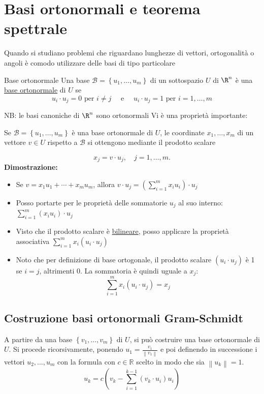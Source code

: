 \section{Basi ortonormali e teorema spettrale}
Quando si studiano problemi che riguardano lunghezze di vettori, ortogonalità o angoli è comodo utilizzare delle basi di tipo particolare

\begin{definizione}{Base ortonormale}
	Una base $ \mathcal{B}= \left\{ u_1,\ldots,u_m \right\}  $ di un sottospazio $ U $ di $ \R^{n} $ è una \underline{base ortonormale} di $ U $ se
	\[
		u_i \cdot u_j = 0 \text{ per } i \neq j \quad \text{ e } \quad  u_i \cdot u_j = 1 \text{ per } i=1,\ldots,m
	\]
\end{definizione}

NB: le basi canoniche di $ \R^{n} $ sono ortonormali
\vskip3mm
Vi è una proprietà importante:
\begin{tcolorbox}
	Se $\mathcal{B}=\left\{u_1, \ldots , u_m\right\}$ è una base ortonormale di $U$, le coordinate $x_1, \ldots, x_m$ di un vettore $v \in U$ rispetto a $\mathcal{B}$ si ottengono mediante il prodotto scalare

\end{tcolorbox}

\[
	x_j=v \cdot u_j, \quad j=1, \ldots, m .
\]
\textbf{Dimostrazione:}
\begin{itemize}
	\item Se $v=x_1 u_1+\cdots+x_m u_m$, allora $v \cdot u_j=\left( \sum_{i=1}^m x_iu_i \right)\cdot u_j$
	\item Posso portarte per le proprietà delle sommatorie $ u_j $ al suo interno: $ \sum_{i=1}^{m} \left( x_i u_i \right) \cdot u_j $
	\item Visto che il prodotto scalare è \underline{bilineare}, posso applicare la proprietà associativa $  \sum_{i=1}^{m}  x_i \left( u_i \cdot u_j \right) $
	\item Noto che per definizione di base ortogonale, il prodotto scalare $ \left( u_i \cdot u_j \right)  $ è 1 se $ i=j $, altrimenti 0. La sommatoria è quindi uguale a $ x_j $:
	      \[
		      \sum_{i=1}^{m} x_i \left( u_i \cdot u_j \right) = x_j
	      \]
\end{itemize}
\subsection{Costruzione basi ortonormali Gram-Schmidt}
A partire da una base $\left\{v_1, \ldots, v_m\right\}$ di $U$, si può costruire una base ortonormale di $U$. Si procede ricorsivamente, ponendo $u_1=\frac{v_1}{\left\|v_1\right\|}$ e poi definendo in successione i vettori $u_2, \ldots, u_m$ con la formula
con $c \in \mathbb{R}$ scelto in modo che sia $\left\|u_k\right\|=1$.
\[
	u_k=c\left(v_k-\sum_{i=1}^{k-1}\left(v_k \cdot u_i\right) u_i\right)
\]


